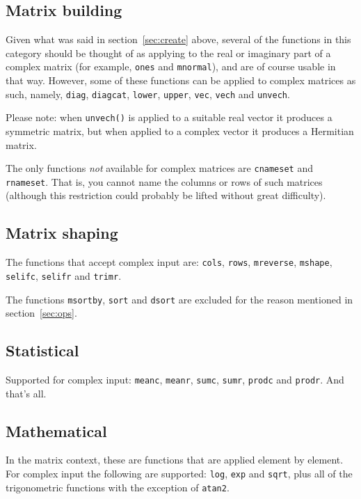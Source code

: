 \documentclass{article}
\begin{document}
\subsection{Matrix building}

Given what was said in section~\ref{sec:create} above, several of the
functions in this category should be thought of as applying to the
real or imaginary part of a complex matrix (for example, \texttt{ones}
and \texttt{mnormal}), and are of course usable in that way.  However,
some of these functions can be applied to complex matrices as such,
namely, \texttt{diag}, \texttt{diagcat}, \texttt{lower},
\texttt{upper}, \texttt{vec}, \texttt{vech} and \texttt{unvech}.

Please note: when \texttt{unvech()} is applied to a suitable real
vector it produces a symmetric matrix, but when applied to a complex
vector it produces a Hermitian matrix.

The only functions \textit{not} available for complex matrices are
\texttt{cnameset} and \texttt{rnameset}. That is, you cannot name the
columns or rows of such matrices (although this restriction could
probably be lifted without great difficulty).

\subsection{Matrix shaping}

The functions that accept complex input are: \texttt{cols},
\texttt{rows}, \texttt{mreverse}, \texttt{mshape}, \texttt{selifc},
\texttt{selifr} and \texttt{trimr}.

The functions \texttt{msortby}, \texttt{sort} and \texttt{dsort} are
excluded for the reason mentioned in section~\ref{sec:ops}.

\subsection{Statistical}

Supported for complex input: \texttt{meanc}, \texttt{meanr},
\texttt{sumc}, \texttt{sumr}, \texttt{prodc} and \texttt{prodr}. And
that's all.

\subsection{Mathematical}

In the matrix context, these are functions that are applied element by
element. For complex input the following are supported: \texttt{log},
\texttt{exp} and \texttt{sqrt}, plus all of the trigonometric
functions with the exception of \texttt{atan2}.
\end{document}
